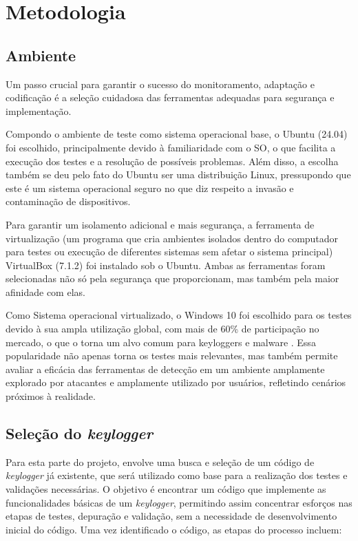 \documentclass[12pt]{article}
\begin{document}
\section{Metodologia}
\subsection{Ambiente}
Um passo crucial para garantir o sucesso do monitoramento, adaptação e codificação é a seleção cuidadosa das ferramentas adequadas para segurança e implementação.

Compondo o ambiente de teste como sistema operacional base, 
o Ubuntu (24.04) foi escolhido, principalmente devido à familiaridade com o SO, 
o que facilita a execução dos testes e a resolução de possíveis problemas. 
Além disso, a escolha também se deu pelo fato do Ubuntu ser uma distribuição Linux, 
pressupondo que este é um sistema operacional seguro no que diz respeito a invasão e contaminação de dispositivos.

Para garantir um isolamento adicional e mais segurança, 
a ferramenta de virtualização (um programa que cria ambientes isolados dentro do computador
para testes ou execução de diferentes sistemas sem afetar o sistema principal) VirtualBox (7.1.2) foi instalado sob o Ubuntu.
Ambas as ferramentas foram selecionadas não só pela segurança que proporcionam, 
mas também pela maior afinidade com elas.

Como Sistema operacional virtualizado, o Windows 10 foi escolhido para os testes devido à sua ampla utilização global,
com mais de 60\% de participação no mercado, o que o 
torna um alvo comum para keyloggers e malware \citep{tomshardware2023}. 
Essa popularidade não apenas torna os testes mais relevantes, mas também
permite avaliar a eficácia das ferramentas de detecção em um ambiente 
amplamente explorado por atacantes e amplamente utilizado por usuários, 
refletindo cenários próximos à realidade.

\subsection{Seleção do \textit{keylogger}}
Para esta parte do projeto, envolve uma busca e seleção de um código de \textit{keylogger} já existente, que será utilizado como base para a realização dos testes e validações necessárias. O objetivo é encontrar um código que implemente as funcionalidades básicas de um \textit{keylogger}, permitindo assim concentrar esforços nas etapas de testes, depuração e validação, sem a necessidade de desenvolvimento inicial do código. Uma vez identificado o código, as etapas do processo incluem:
\end{document}
